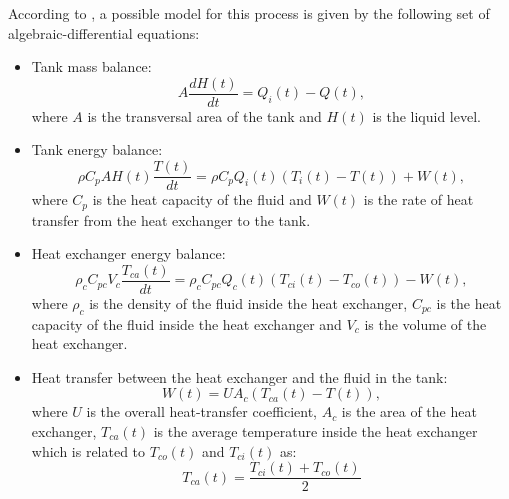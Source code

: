 According to \citet{Alfaro2016}, a possible model for this process is given by the following set of algebraic-differential equations:
\begin{itemize}
	\item Tank mass balance:
			\begin{equation*}
				A \frac{d H(t)}{dt} = Q_i(t) - Q(t),
			\end{equation*}
			where $A$ is the transversal area of the tank and $H(t)$ is the liquid level.
	\item Tank energy balance:
			\begin{equation*}
				\rho C_p A H(t) \frac{T(t)}{dt} = \rho C_p Q_i(t)\left( T_i(t) - T(t)\right) + W(t),
			\end{equation*}
			where $C_p$ is the heat capacity of the fluid and $W(t)$ is the rate of heat transfer from the heat exchanger to the tank. %
	\item Heat exchanger energy balance:
			\begin{equation*}
				\rho_c C_{pc} V_c \frac{T_{ca}(t)}{dt} = \rho_c C_{pc} Q_c(t)\left( T_{ci}(t)-T_{co}(t)\right) - W(t),
			\end{equation*}
			where $\rho_c$ is the density of the fluid inside the heat exchanger, $C_{pc}$ is the heat capacity of the fluid inside the heat exchanger and $V_c$ is the volume of the heat exchanger.
	\item Heat transfer between the heat exchanger and the fluid in the tank:
			\begin{equation*}
				W(t) = U A_c \left( T_{ca}(t) - T(t)\right), 
			\end{equation*}
			where $U$ is the overall heat-transfer coefficient, $A_c$ is the area of the heat exchanger, $T_{ca}(t)$ is the average temperature inside the heat exchanger which is related to $T_{co}(t)$ and $T_{ci}(t)$ as:
			\begin{equation*}
				T_{ca}(t) = \frac{T_{ci}(t) + T_{co}(t)}{2}
			\end{equation*}
\end{itemize}

